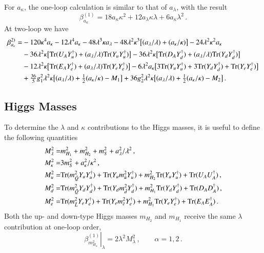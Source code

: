 \documentclass[final,3p,times,pdflatex]{elsarticle}
\newcommand{\lamsq}{\lambda^2}
\newcommand{\kapsq}{\kappa^2}
\newcommand{\tr}{\mathrm{Tr}}
\newcommand{\mhusq}{m^2_{H_2}}
\newcommand{\mhdsq}{m^2_{H_1}}
\newcommand{\mlamsq}{M_\lambda^2}
\newcommand{\mkapsq}{M_\kappa^2}
\newcommand{\mssq}{m_S^2}
\newcommand{\mqsq}{m_{\tilde{Q}}^2}
\newcommand{\mdsq}{m_{\tilde{d}}^2}
\newcommand{\musq}{m_{\tilde{u}}^2}
\newcommand{\mlsq}{m_{\tilde{L}}^2}
\newcommand{\mesq}{m_{\tilde{e}}^2}
\newcommand{\Alam}{a_\lambda/\lambda}
\newcommand{\Akap}{a_\kappa/\kappa}
\newcommand{\Musq}{M_u^2}
\newcommand{\Mdsq}{M_d^2}
\newcommand{\Mesq}{M_e^2}
\begin{document}
For $a_\kappa$, the one-loop calculation is similar to that of $a_\lambda$, with 
the result
%
\begin{equation}
\beta_{a_\kappa}^{(1)} = 18a_\kappa\kappa^2 + 12a_\lambda\kappa\lambda 
+ 6a_\kappa\lamsq\,.
\end{equation}
%
At two-loop we have
%
\begin{align}
\beta_{a_\kappa}^{2)} =& -120\kappa^4 a_\kappa - 12\lambda^4 a_\kappa 
- 48\lambda^3\kappa a_\lambda - 48\lamsq\kappa^3\big[ (\Alam) + (\Akap)\big]
-24\lamsq\kapsq a_\kappa \notag \\
%
&-36\lamsq\kappa\big[ \tr( U_A Y_u^\dagger) + (\Alam)\tr( Y_u Y_u^\dagger)\big]
-36\lamsq\kappa\big[ \tr( D_A Y_d^\dagger) + (\Alam)\tr( Y_d Y_d^\dagger)\big] 
\notag \\
%
&-12\lamsq\kappa\big[ \tr( E_A Y_e^\dagger) + (\Alam)\tr( Y_e Y_e^\dagger)\big]
-6\lamsq a_\kappa\big[ 3\tr( Y_u Y_u^\dagger) + 3\tr( Y_d Y_d^\dagger) 
+ \tr( Y_e Y_e^\dagger) \big] \notag \\
%
&+ \tfrac{36}{5}g_1^2\lamsq\kappa\big[ (\Alam) + \tfrac{1}{2}(\Akap) - M_1\big] 
+ 36g_2^2\lamsq \kappa\big[ (\Alam) + \tfrac{1}{2}(\Akap) - M_2 \big]\,.
\end{align}

\subsection{Higgs Masses}
To determine the $\lambda$ and $\kappa$ contributions to the Higgs masses, it is useful to define \cite{Ellwanger:2009dp} the following quantities 
%
\begin{align}
\mlamsq =& \mhdsq + \mhusq + \mssq + a_\lambda^2/\lamsq\,, \notag \\
%
\mkapsq =& 3\mssq + a_\kappa^2/\kapsq\,, \notag \\
%
\Musq =& \tr(\mqsq Y_u Y_u^\dagger) + \tr( Y_u\musq Y_u^\dagger)
+ \mhusq\tr( Y_u Y_u^\dagger) + \tr( U_A U_A^\dagger)\,, \notag \\
%
\Mdsq =& \tr(\mqsq Y_d Y_d^\dagger) + \tr( Y_d\mdsq Y_d^\dagger) 
+ \mhdsq\tr( Y_d Y_d^\dagger) + \tr( D_A D_A^\dagger)\,, \notag \\
%
\Mesq =& \tr(\mlsq Y_e Y_e^\dagger) + \tr( Y_e\mesq Y_e^\dagger) 
+ \mhdsq\tr( Y_e Y_e^\dagger) + \tr( E_A E_A^\dagger)\,. \notag \\
\end{align}
%
Both the up- and down-type Higgs masses $m_{H_2}$ and $m_{H_1}$ receive the same 
$\lambda$ contribution at one-loop order, 
%
\begin{equation}
\left.\beta_{m_{H_\alpha}^2}^{(1)}\right|_\lambda = 2\lamsq \mlamsq\,, \qquad \alpha = 1,2\,.
\end{equation}
%
\end{document}
